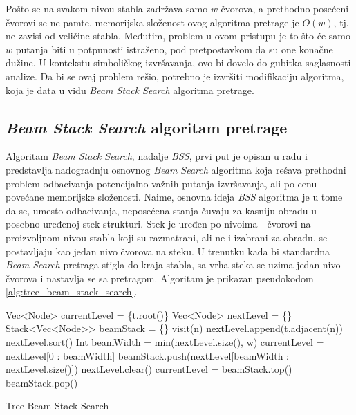 \documentclass[a4paper]{article}
\begin{document}
Pošto se na svakom nivou stabla zadržava samo $w$ čvorova, a prethodno posećeni čvorovi se ne pamte, memorijska složenost ovog algoritma pretrage je $O(w)$, tj. ne zavisi od veličine stabla. Međutim, problem u ovom pristupu je to što će samo $w$ putanja biti u potpunosti istraženo, pod pretpostavkom da su one konačne dužine. U kontekstu simboličkog izvršavanja, ovo bi dovelo do gubitka saglasnosti analize. Da bi se ovaj problem rešio, potrebno je izvršiti modifikaciju algoritma, koja je data u vidu \textit{Beam Stack Search} algoritma pretrage.

\subsection{\textit{Beam Stack Search} algoritam pretrage}

Algoritam \textit{Beam Stack Search}, nadalje \textit{BSS}, prvi put je opisan u radu \cite{BeamStackSearch-10.5555/3037062.3037074} i predstavlja nadogradnju osnovnog \textit{Beam Search} algoritma koja rešava prethodni problem odbacivanja potencijalno važnih putanja izvršavanja, ali po cenu povećane memorijske složenosti. Naime, osnovna ideja \textit{BSS} algoritma je u tome da se, umesto odbacivanja, neposećena stanja čuvaju za kasniju obradu u posebno uređenoj stek strukturi. Stek je uređen po nivoima - čvorovi na proizvoljnom nivou stabla koji su razmatrani, ali ne i izabrani za obradu, se postavljaju kao jedan nivo čvorova na steku. U trenutku kada bi standardna \textit{Beam Search} pretraga stigla do kraja stabla, sa vrha steka se uzima jedan nivo čvorova i nastavlja se sa pretragom. Algoritam je prikazan pseudokodom \ref{alg:tree_beam_stack_search}.

\begin{algorithm}
    \begin{algorithmic}[1]
                \State Vec<Node> currentLevel = \{t.root()\}
                \State Vec<Node> nextLevel = \{\}
                \State Stack<Vec<Node>{>} beamStack = \{\}
                        \State visit(n)
                        \State nextLevel.append(t.adjacent(n))
                    \EndFor
                    \State nextLevel.sort()
                    \State Int beamWidth = min(nextLevel.size(), w)
                    \State currentLevel = nextLevel[0 : beamWidth]
                        \State beamStack.push(nextLevel[beamWidth : nextLevel.size()])
                    \EndIf
                    \State nextLevel.clear()
                        \State currentLevel = beamStack.top()
                        \State beamStack.pop()
                    \EndIf
                \EndWhile
            \EndProcedure
    \end{algorithmic}
    \caption{Tree Beam Stack Search}
    \label{alg:tree_beam_stack_search}
\end{algorithm}
\end{document}
